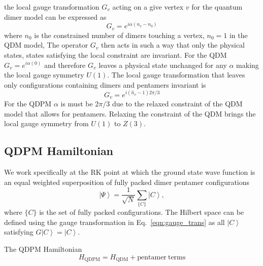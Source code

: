 \documentclass[aps,floatfix,11pt,twocolumn]{revtex4-1}
\begin{document}
        the local gauge transformation $G_v$ acting on a give vertex $v$ for the quantum dimer model
        can be expressed as
        \begin{equation}
            \label{}
            G_v=e^{i \alpha (n_v - n_0)}
        \end{equation}
        where $n_0$ is the constrained number of dimers touching a vertex, $n_0=1$ in the QDM model,
        The operator $G_v$ then acts in such a
        way that only the physical states, states satisfying the local constraint 
        are invariant. For the QDM $G_v =
        e^{i\alpha (0)}$ and therefore $G_v$ leaves a physical state unchanged for any
        $\alpha$ making the local gauge symmetry $U(1)$. The local gauge transformation that leaves
        only configurations containing dimers and pentamers invariant is
        \begin{equation}
            \label{eqn:gauge_trans}
            G_v = e^{i (\hat{n}_v -1) 2\pi/3}    
        \end{equation}
        For the QDPM $\alpha$ is must be $2\pi/3$ due to the relaxed constraint of the QDM
        model that allows for pentamers. Relaxing the constraint of the QDM brings the local gauge
        symmetry from $U(1)$ to $Z(3)$.

    \subsection{QDPM Hamiltonian}

        We work specifically at the RK point at which the ground state wave function
        is an equal weighted superposition of fully packed dimer pentamer configurations
        \begin{equation}
            \label{}
            \left| \Psi \right\rangle = \frac{1}{\sqrt{N}}\sum_{\{C\}} \left| C \right\rangle
            ,
        \end{equation}
        where $\{C\}$ is the set of fully packed configurations. The Hilbert space can be defined
        using the gauge transformation in Eq.~\ref{eqn:gauge_trans} as all $\left| C \right\rangle$
        satisfying $G \left| C \right\rangle = \left| C \right\rangle$.

        The QDPM Hamiltonian
        \begin{equation}
            H_{\mathrm{QDPM}} = H_{\mathrm{QDM}} + \mathrm{pentamer\ terms}
        \end{equation}
\end{document}
